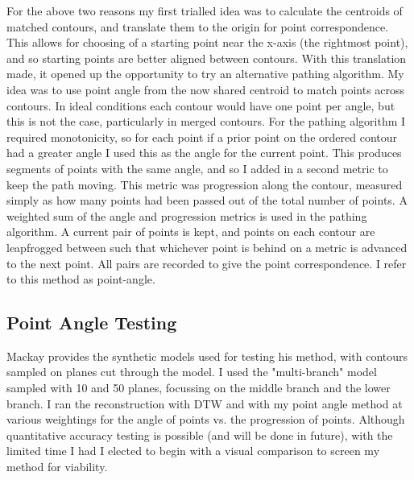 \documentclass[11pt]{article}
\begin{document}
For the above two reasons my first trialled idea was to calculate the centroids of matched contours, and translate them to the origin for point correspondence. This allows for choosing of a starting point near the x-axis (the rightmost point), and so starting points are better aligned between contours. With this translation made, it opened up the opportunity to try an alternative pathing algorithm. My idea was to use point angle from the now shared centroid to match points across contours. In ideal conditions each contour would have one point per angle, but this is not the case, particularly in merged contours. For the pathing algorithm I required monotonicity, so for each point if a prior point on the ordered contour had a greater angle I used this as the angle for the current point. This produces segments of points with the same angle, and so I added in a second metric to keep the path moving. This metric was progression along the contour, measured simply as how many points had been passed out of the total number of points. A weighted sum of the angle and progression metrics is used in the pathing algorithm. A current pair of points is kept, and points on each contour are leapfrogged between such that whichever point is behind on a metric is advanced to the next point. All pairs are recorded to give the point correspondence. I refer to this method as point-angle.

\subsection{Point Angle Testing}

Mackay provides the synthetic models used for testing his method, with contours sampled on planes cut through the model. I used the "multi-branch" model sampled with 10 and 50 planes, focussing on the middle branch and the lower branch. I ran the reconstruction with DTW and with my point angle method at various weightings for the angle of points vs. the progression of points. Although quantitative accuracy testing is possible (and will be done in future), with the limited time I had I elected to begin with a visual comparison to screen my method for viability. 
\end{document}
